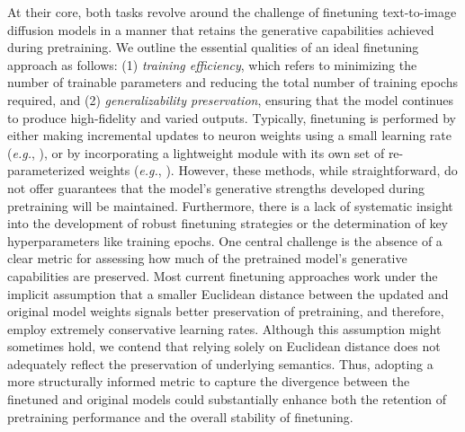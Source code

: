 At their core, both tasks revolve around the challenge of finetuning text-to-image diffusion models in a manner that retains the generative capabilities achieved during pretraining. We outline the essential qualities of an ideal finetuning approach as follows: (1) \emph{training efficiency}, which refers to minimizing the number of trainable parameters and reducing the total number of training epochs required, and (2) \emph{generalizability preservation}, ensuring that the model continues to produce high-fidelity and varied outputs. Typically, finetuning is performed by either making incremental updates to neuron weights using a small learning rate (\emph{e.g.}, \cite{ruiz2023dreambooth}), or by incorporating a lightweight module with its own set of re-parameterized weights (\emph{e.g.}, \cite{hulora2022,zhang2023adding}). However, these methods, while straightforward, do not offer guarantees that the model’s generative strengths developed during pretraining will be maintained. Furthermore, there is a lack of systematic insight into the development of robust finetuning strategies or the determination of key hyperparameters like training epochs. One central challenge is the absence of a clear metric for assessing how much of the pretrained model’s generative capabilities are preserved. Most current finetuning approaches work under the implicit assumption that a smaller Euclidean distance between the updated and original model weights signals better preservation of pretraining, and therefore, employ extremely conservative learning rates. Although this assumption might sometimes hold, we contend that relying solely on Euclidean distance does not adequately reflect the preservation of underlying semantics. Thus, adopting a more structurally informed metric to capture the divergence between the finetuned and original models could substantially enhance both the retention of pretraining performance and the overall stability of finetuning.

